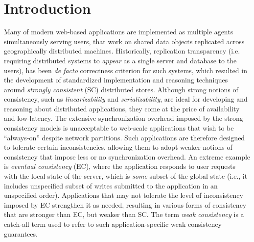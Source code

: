 \section{Introduction}
\label{sec:intro}

Many of modern web-based applications are implemented as multiple
agents simultaneously serving users, that work on shared data objects
replicated across geographically distributed machines.  Historically,
replication transparency (i.e. requiring distributed systems to
\emph{appear} as a single server and database to the users), has been
\emph{de facto} correctness criterion for such systems, which resulted
in the development of standardized implementation and reasoning
techniques around \emph{strongly consistent} (SC) distributed stores.
Although strong notions of consistency, such as \emph{linearizability}
and \emph{serializability}, are ideal for developing and reasoning
about distributed applications, they come at the price of availability
and low-latency. The extensive synchronization overhead imposed by the
strong consistency models is unacceptable to web-scale applications
that wish to be ``always-on'' despite network partitions.  Such
applications are therefore designed to tolerate certain
inconsistencies, allowing them to adopt weaker notions of consistency
that impose less or no synchronization overhead. An extreme example is
\emph{eventual consistency} (EC), where the application responds to
user requests with the local state of the server, which is \emph{some}
subset of the global state (i.e., it includes unspecified subset of
writes submitted to the application in an unspecified order).
Applications that may not tolerate the level of inconsistency imposed
by EC strengthen it as needed, resulting in various forms of
consistency that are stronger than EC, but weaker than SC. The term
\emph{weak consistency} is a catch-all term used to refer to such
application-specific weak consistency guarantees.

